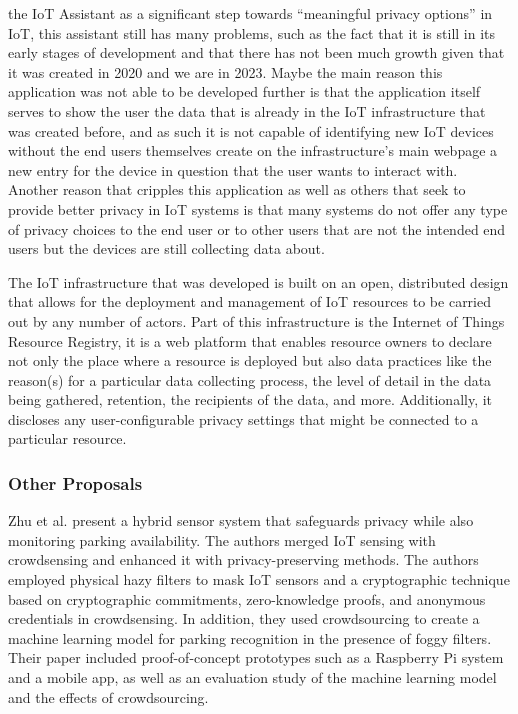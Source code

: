 the IoT Assistant as a significant step towards ``meaningful privacy options''
in IoT, this assistant still has many problems, such as the fact that it
is still in its early stages of development and that there has not been much
growth given that it was created in 2020 and we are in 2023. Maybe the main
reason this application was not able to be developed further is that the
application itself serves to show the user the data that is already in the
IoT infrastructure that was created before, and as such it is not capable
of identifying new IoT devices without the end users themselves create on
the infrastructure's main webpage \cite{DasPersonalized} a new entry for
the device in question that the user wants to interact with. Another reason
that cripples this application as well as others that seek to provide better
privacy in IoT systems is that many systems do not offer any type of privacy
choices to the end user or to other users that are not the intended end
users but the devices are still collecting data about.

The IoT infrastructure that was developed \cite{DasPersonalized} is built
on an open, distributed design that allows for the deployment and management
of IoT resources to be carried out by any number of actors. Part of this
infrastructure is the Internet of Things Resource Registry, it is a web
platform that enables resource owners to declare not only the place where
a resource is deployed but also data practices like the reason(s) for a
particular data collecting process, the level of detail in the data being
gathered, retention, the recipients of the data, and more. Additionally,
it discloses any user-configurable privacy settings that might be connected
to a particular resource.

\subsubsection{Other Proposals}

Zhu et al. \cite{ZhuIntegrating} present a hybrid sensor system that safeguards
privacy while also monitoring parking availability. The authors merged IoT
sensing with crowdsensing and enhanced it with privacy-preserving methods.
The authors employed physical hazy filters to mask IoT sensors
and a cryptographic technique based on cryptographic commitments, zero-knowledge
proofs, and anonymous credentials in crowdsensing. In addition, they used
crowdsourcing to create a machine learning model for parking recognition
in the presence of foggy filters. Their paper included proof-of-concept
prototypes such as a Raspberry Pi system and a mobile app, as well as an
evaluation study of the machine learning model and the effects of crowdsourcing.

